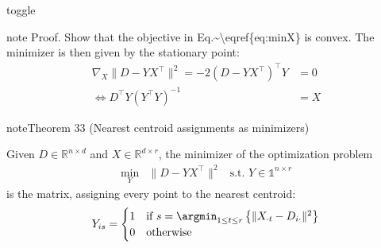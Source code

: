 \documentclass[letterpaper,10pt,english]{jupyterBook}
\begin{document}
\begin{sphinxuseclass}{toggle}
\begin{sphinxadmonition}{note}
\sphinxAtStartPar
Proof. Show that the objective in Eq.\textasciitilde{}\textbackslash{}eqref\{eq:minX\} is  convex. The minimizer is then given by the stationary point:
\label{equation:clustering_k_means_mf:c722e43a-99d9-48df-a1c0-1befed9ea6ff}\begin{align}
    \nabla_X \lVert D-YX^\top\rVert^2 = -2(D-YX^\top)^\top Y &=0\\
    \Leftrightarrow D^\top Y(Y^\top Y)^{-1} &= X 
\end{align}\end{sphinxadmonition}

\end{sphinxuseclass}\label{clustering_k_means_mf:theorem-3}
\begin{sphinxadmonition}{note}{Theorem 33 (Nearest centroid assignments as minimizers)}



\sphinxAtStartPar
Given \(D\in\mathbb{R}^{n\times d}\) and \(X\in\mathbb{R}^{d\times r}\), the minimizer of the optimization problem
\label{equation:clustering_k_means_mf:55daa69e-f00a-4779-93e7-7811dcb2c11d}\begin{align}
    \min_Y& \lVert D-YX^\top \rVert^2 & \text{s.t. } Y\in\mathbb{1}^{n\times r}
\end{align}
\sphinxAtStartPar
is the matrix, assigning every point to the nearest centroid:
\begin{equation*}
\begin{split}Y_{is}=
\begin{cases}
1& \text{if } s=\argmin_{1\leq t\leq r}\left\{\|X_{\cdot t}-D_{i\cdot}\|^2\right\}\\
0& \text{otherwise}
\end{cases}\end{split}
\end{equation*}
\end{sphinxadmonition}
\end{document}
